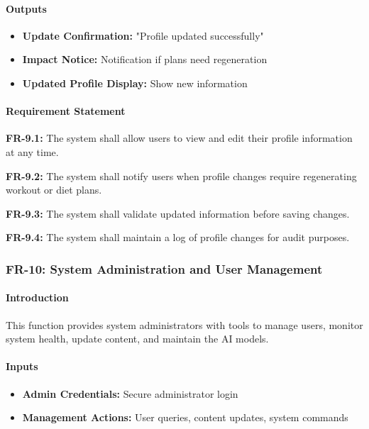 \documentclass[12pt,a4paper]{article}
\begin{document}
\paragraph{Outputs}
\begin{itemize}
    \item \textbf{Update Confirmation:} "Profile updated successfully"
    \item \textbf{Impact Notice:} Notification if plans need regeneration
    \item \textbf{Updated Profile Display:} Show new information
\end{itemize}

\paragraph{Requirement Statement}
\textbf{FR-9.1:} The system shall allow users to view and edit their profile information at any time.

\textbf{FR-9.2:} The system shall notify users when profile changes require regenerating workout or diet plans.

\textbf{FR-9.3:} The system shall validate updated information before saving changes.

\textbf{FR-9.4:} The system shall maintain a log of profile changes for audit purposes.

\subsubsection{FR-10: System Administration and User Management}

\paragraph{Introduction}
This function provides system administrators with tools to manage users, monitor system health, update content, and maintain the AI models.

\paragraph{Inputs}
\begin{itemize}
    \item \textbf{Admin Credentials:} Secure administrator login
    \item \textbf{Management Actions:} User queries, content updates, system commands
\end{itemize}
\end{document}

